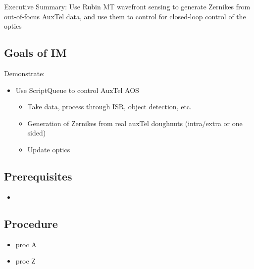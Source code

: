 
Executive Summary:
Use Rubin MT wavefront sensing to generate Zernikes from out-of-focus AuxTel data,
and use them to control for closed-loop control of the optics

\subsection{Goals of IM}
Demonstrate:
\begin{itemize}
\item Use ScriptQueue to control AuxTel AOS
\begin{itemize}
\item Take data, process through ISR, object detection, etc.
\item Generation of Zernikes from real auxTel doughnuts (intra/extra or one sided)
\item Update optics
\end{itemize}
\end{itemize}

\subsection{Prerequisites}
\begin{itemize}
\item {}
\end{itemize}

\subsection{Procedure}
\begin{itemize}
\item proc A
\item proc Z
\end{itemize}
